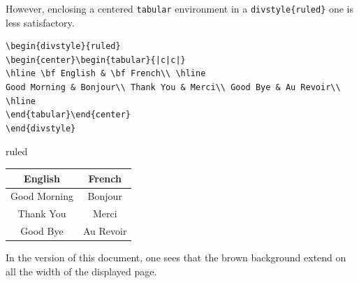 However, enclosing a centered
\texttt{tabular} environment in a \texttt{divstyle\{ruled\}} one 
is less satisfactory.
\begin{verbatim}
\begin{divstyle}{ruled}
\begin{center}\begin{tabular}{|c|c|}
\hline \bf English & \bf French\\ \hline
Good Morning & Bonjour\\ Thank You & Merci\\ Good Bye & Au Revoir\\ \hline
\end{tabular}\end{center}
\end{divstyle}
\end{verbatim}
\begin{htmlonly}
\begin{divstyle}{ruled}
\begin{center}\begin{tabular}{|c|c|}
\hline \bf English & \bf French\\ \hline
Good Morning & Bonjour\\ Thank You & Merci\\ Good Bye & Au Revoir\\
\hline
\end{tabular}\end{center}
\end{divstyle}
\end{htmlonly}
In the \html{} version of this document,
one sees that the brown background extend on all the width
of the displayed page.

